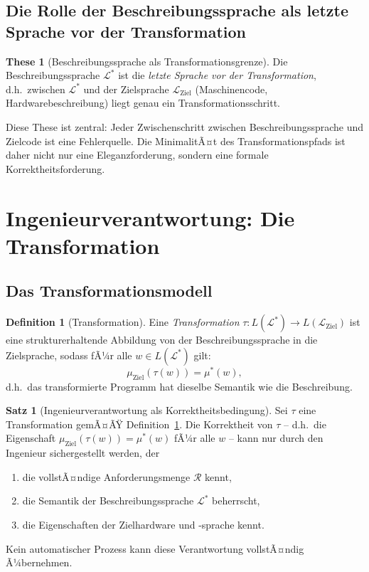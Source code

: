 ﻿\documentclass[a4paper,12pt]{article}
\theoremstyle{definition}
\newtheorem{definition}{Definition}
\newtheorem{satz}{Satz}
\newtheorem{these}{These}
\begin{document}
\subsection{Die Rolle der Beschreibungssprache als letzte Sprache vor der Transformation}

\begin{these}[Beschreibungssprache als Transformationsgrenze]
Die Beschreibungssprache $\mathcal{L}^*$ ist die \emph{letzte Sprache vor der
Transformation}, d.h.\ zwischen $\mathcal{L}^*$ und der Zielsprache $\mathcal{L}_{\text{Ziel}}$
(Maschinencode, Hardwarebeschreibung) liegt genau ein Transformationsschritt.
\end{these}

Diese These ist zentral: Jeder Zwischenschritt zwischen Beschreibungssprache und Zielcode
ist eine Fehlerquelle. Die MinimalitÃ¤t des Transformationspfads ist daher nicht nur eine
Eleganzforderung, sondern eine formale Korrektheitsforderung.

\section{Ingenieurverantwortung: Die Transformation}
\label{sec:transformation}

\subsection{Das Transformationsmodell}

\begin{definition}[Transformation]
\label{def:transformation}
Eine \emph{Transformation} $\tau: L(\mathcal{L}^*) \to L(\mathcal{L}_{\text{Ziel}})$
ist eine strukturerhaltende Abbildung von der Beschreibungssprache in die Zielsprache,
sodass fÃ¼r alle $w \in L(\mathcal{L}^*)$ gilt:
\[
  \mu_{\text{Ziel}}(\tau(w)) = \mu^*(w),
\]
d.h.\ das transformierte Programm hat dieselbe Semantik wie die Beschreibung.
\end{definition}

\begin{satz}[Ingenieurverantwortung als Korrektheitsbedingung]
\label{satz:ingverantwortung}
Sei $\tau$ eine Transformation gemÃ¤ÃŸ Definition~\ref{def:transformation}.
Die Korrektheit von $\tau$ -- d.h.\ die Eigenschaft $\mu_{\text{Ziel}}(\tau(w)) = \mu^*(w)$
fÃ¼r alle $w$ -- kann nur durch den Ingenieur sichergestellt werden, der
\begin{enumerate}
  \item die vollstÃ¤ndige Anforderungsmenge $\mathcal{R}$ kennt,
  \item die Semantik der Beschreibungssprache $\mathcal{L}^*$ beherrscht,
  \item die Eigenschaften der Zielhardware und -sprache kennt.
\end{enumerate}
Kein automatischer Prozess kann diese Verantwortung vollstÃ¤ndig Ã¼bernehmen.
\end{satz}
\end{document}
